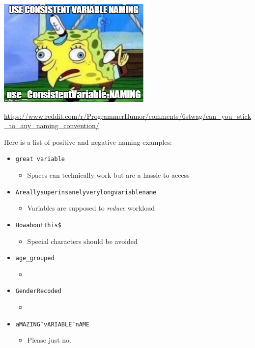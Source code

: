 \documentclass[
]{book}
\providecommand{\tightlist}{%
  \setlength{\itemsep}{0pt}\setlength{\parskip}{0pt}}
\begin{document}
\includegraphics[width=\textwidth,height=2.08333in]{./img/varname.png}

\url{https://www.reddit.com/r/ProgrammerHumor/comments/6stwag/can_you_stick_to_any_naming_convention/}

Here is a list of positive and negative naming examples:

\begin{itemize}
\tightlist
\item
  \texttt{great\ variable}

  \begin{itemize}
  \tightlist
  \item
    Spaces can technically work but are a hassle to access
  \end{itemize}
\item
  \texttt{Areallysuperinsanelyverylongvariablename}

  \begin{itemize}
  \tightlist
  \item
    Variables are supposed to \emph{reduce} workload
  \end{itemize}
\item
  \texttt{Howaboutthis\$}

  \begin{itemize}
  \tightlist
  \item
    Special characters should be avoided
  \end{itemize}
\item
  \texttt{age\_grouped}

  \begin{itemize}
  \tightlist
  \item
  \end{itemize}
\item
  \texttt{GenderRecoded}

  \begin{itemize}
  \tightlist
  \item
  \end{itemize}
\item
  \texttt{aMAZING¯vARIABLE¯nAME}

  \begin{itemize}
  \tightlist
  \item
    Please just no.
  \end{itemize}
\end{itemize}
\end{document}
